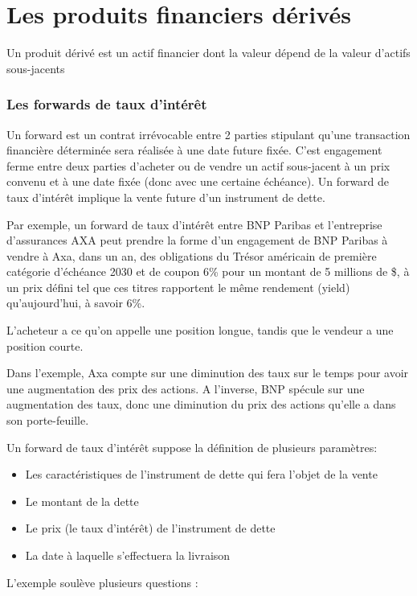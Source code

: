 \part{Les produits financiers dérivés}

Un produit dérivé est un actif financier dont la valeur dépend de la valeur d'actifs sous-jacents

\section{Les forwards de taux d'intérêt}

Un forward est un contrat irrévocable entre 2 parties stipulant qu'une transaction financière déterminée sera réalisée à une date future fixée. C'est engagement ferme entre deux parties d'acheter ou de vendre un actif sous-jacent à un prix convenu et à une date fixée (donc avec une certaine échéance). Un forward de taux d'intérêt implique la vente future d'un instrument de dette.

Par exemple, un forward de taux d'intérêt entre BNP Paribas et l'entreprise d'assurances AXA peut prendre la forme d’un engagement de BNP Paribas à vendre à Axa, dans un an, des obligations du Trésor américain de première catégorie d'échéance 2030 et de coupon 6\% pour un montant de 5 millions de \$, à un prix défini tel que ces titres rapportent le même rendement (yield) qu’aujourd'hui, à savoir 6\%. 

L'acheteur a ce qu'on appelle une position longue, tandis que le vendeur a une position courte.

Dans l'exemple, Axa compte sur une diminution des taux sur le temps pour avoir une augmentation des prix des actions. A l'inverse, BNP spécule sur une augmentation des taux, donc une diminution du prix des actions qu'elle a dans son porte-feuille.

Un forward de taux d'intérêt suppose la définition de plusieurs paramètres: 
\begin{itemize}
	\item Les caractéristiques de l'instrument de dette qui fera l'objet de la vente 
	\item Le montant de la dette 
	\item Le prix (le taux d'intérêt) de l'instrument de dette 
	\item La date à laquelle s'effectuera la livraison
\end{itemize}

L'exemple soulève plusieurs questions :


